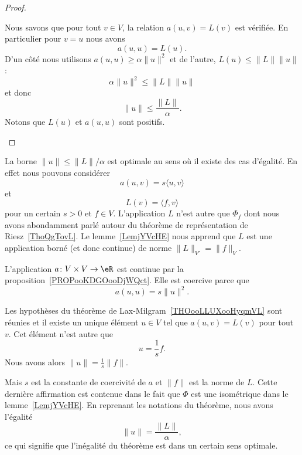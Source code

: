 \begin{proof}
\begin{subproof}
		Nous savons que pour tout \( v\in V\), la relation \( a(u,v)=L(v)\) est vérifiée. En particulier pour \( v=u\) nous avons
		\begin{equation}
			a(u,u)=L(u).
		\end{equation}
		D'un côté nous utilisons \( a(u,u)\geq \alpha\| u \|^2\) et de l'autre, \( L(u)\leq \| L \|\| u \|\) :
		\begin{equation}
			\alpha\| u \|^2\leq \| L \|\| u \|
		\end{equation}
		et donc
		\begin{equation}
			\| u \|\leq \frac{ \| L \| }{ \alpha }.
		\end{equation}
		Notons que \( L(u)\) et \( a(u,u)\) sont positifs.
	\end{subproof}
\end{proof}

\begin{example}      \label{EXooTTBDooUNhBOc}
	La borne \( \| u \|\leq \| L \|/\alpha\) est optimale au sens où il existe des cas d'égalité. En effet nous pouvons considérer
	\begin{equation}
		a(u,v)=s\langle u, v\rangle
	\end{equation}
	et
	\begin{equation}
		L(v)=\langle f, v\rangle
	\end{equation}
	pour un certain \( s>0\) et \( f\in V\). L'application \( L\) n'est autre que \( \Phi_f\) dont nous avons abondamment parlé autour du théorème de représentation de Riesz~\ref{ThoQgTovL}. Le lemme~\ref{LemjYVcHE} nous apprend que \( L\) est une application borné (et donc continue) de norme \( \| L \|_{V'}=\| f \|_V\).

	L'application \( a\colon V\times V\to \eR\) est continue par la proposition~\ref{PROPooKDGOooDjWQct}. Elle est coercive parce que
	\begin{equation}
		a(u,u)=s\| u \|^2.
	\end{equation}

	Les hypothèses du théorème de Lax-Milgram~\ref{THOooLLUXooHyqmVL} sont réunies et il existe un unique élément \(u\in V\) tel que \( a(u,v)=L(v)\) pour tout \( v\). Cet élément n'est autre que
	\begin{equation}
		u=\frac{1}{ s }f.
	\end{equation}
	Nous avons alors \( \| u \|=\frac{1}{ s }\| f \|\).

	Mais \( s\) est la constante de coercivité de \( a\) et \( \| f \|\) est la norme de \( L\). Cette dernière affirmation est contenue dans le fait que \( \Phi\) est une isométrique dans le lemme~\ref{LemjYVcHE}. En reprenant les notations du théorème, nous avons l'égalité
	\begin{equation}
		\| u \|=\frac{ \| L \| }{ \alpha },
	\end{equation}
	ce qui signifie que l'inégalité du théorème est dans un certain sens optimale.
\end{example}

